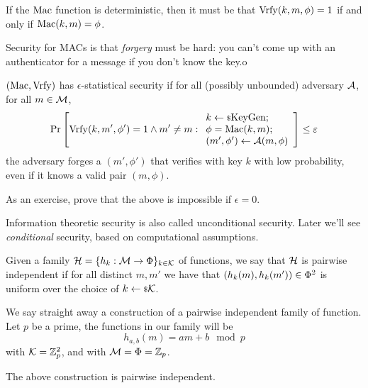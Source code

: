If the $\mathrm{Mac}$ function is deterministic, then it must be that $\mathrm{Vrfy}(k, m, \phi) = 1$ if and only if $\mathrm{Mac}(k, m) = \phi$.

Security for \acp{MAC} is that \emph{forgery} must be hard: you can't come up with an authenticator for a message if you don't know the key.o

\begin{definition}
	$(\mathrm{Mac}, \mathrm{Vrfy})$ has $\epsilon$-statistical security if for all (possibly unbounded) adversary $\mathcal{A}$, for all $m \in \mathcal{M}$,
	\begin{equation*}
		\mathop{\mathrm{Pr}}\limits_{} \left[ {
			\mathrm{Vrfy}(k, m', \phi') = 1 \land m' \neq m :
			\begin{array}{l}
				k \leftarrow {\scriptstyle \$} {\mathrm{KeyGen}}; \; \\
				\phi = \mathrm{Mac}(k,m); \; \\
				(m', \phi') \leftarrow \mathcal{A}(m,\phi)
			\end{array}
		} \right] \le \varepsilon
	\end{equation*}
	\ie the adversary forges a $(m',\phi')$ that verifies with key $k$ with low probability, even if it knows a valid pair $(m, \phi)$.
\end{definition}

As an exercise, prove that the above is impossible if $\epsilon = 0$.

Information theoretic security is also called unconditional security.
Later we'll see \emph{conditional} security, based on computational assumptions.

\begin{definition}
	Given a family $\mathcal{H} = \{ h_k : \mathcal{M} \to \Phi \}_{k \in \mathcal{K}}$ of functions, we say that $\mathcal{H}$ is pairwise independent if for all distinct $m, m'$ we have that $(h_k(m), h_k(m')) \in \Phi^2$ is uniform over the choice of $k \leftarrow {\scriptstyle \$} {\mathcal{K}}$.
\end{definition}

We say straight away a construction of a pairwise independent family of function.
Let $p$ be a prime, the functions in our family will be
\begin{equation*}
	h_{a,b}(m) = a m + b \mod p
\end{equation*}
with $\mathcal{K} = \mathbb{Z}^2_p$, and with $\mathcal{M} = \Phi = \mathbb{Z}_p$.

\begin{theorem} \label{thm:mod-pairwise-independent}
	The above construction is pairwise independent.
\end{theorem}

